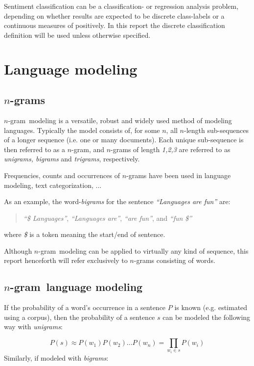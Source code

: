 \documentclass[a4paper,11pt]{kth-mag}
\newcommand{\todo}{ ... }
\newcommand{\ngram}{$n$-gram}
\begin{document}
Sentiment classification can be a classification- or regression analysis problem\cite{liu2012sentiment}, depending on whether results are expected to be discrete class-labels or a continuous measures of positively. In this report the discrete classification definition will be used unless otherwise specified.

\section{Language modeling}

\subsection{\ngram s}
\ngram~modeling is a versatile, robust and widely used method of modeling languages. Typically the model consists of, for some $n$, all $n$-length sub-sequences of a longer sequence (i.e. one or many documents). Each unique sub-sequence is then referred to as a \ngram, and \ngram s of length \emph{1,2,3} are referred to as \emph{unigrams, bigrams} and \emph{trigrams}, respectively\cite{ngrams}.

Frequencies, counts and occurrences of \ngram s have been used in language modeling\cite{chen_goodman}, text categorization\cite{ngrams}, \todo

As an example, the word-\emph{bigrams} for the sentence \emph{``Languages are fun''} are:
\begin{quote}
  \vspace*{0.1cm}
  \centering
\emph{``\$ Languages''}, \emph{``Languages are''}, \emph{``are fun''}, and \emph{``fun \$''}
\end{quote}
where \emph{\$} is a token meaning the start/end of sentence.

Although \ngram~modeling can be applied to virtually any kind of sequence, this report henceforth will refer exclusively to \ngram s consisting of words.

\subsection{\ngram~language modeling}
If the probability of a word's occurrence in a sentence $P$ is known (e.g. estimated using a corpus), then the probability of a sentence $s$ can be modeled the following way with \emph{unigrams}:

\begin{equation} \label{eq:unigram_chain_prob}
P(s) \approx P(w_1) P(w_2) \dots P(w_n) =\prod_{w_i \in s}P(w_i)
\end{equation}
Similarly, if modeled with \emph{bigrams}:
\end{document}
